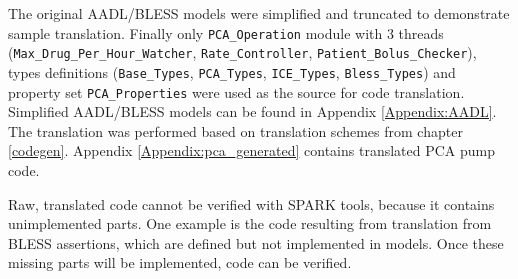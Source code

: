 The original AADL/BLESS models were simplified and truncated to demonstrate sample translation. Finally only \lstinline{PCA_Operation} module with 3 threads (\lstinline{Max_Drug_Per_Hour_Watcher}, \lstinline{Rate_Controller}, \lstinline{Patient_Bolus_Checker}), types definitions (\lstinline{Base_Types}, \lstinline{PCA_Types}, \lstinline{ICE_Types}, \lstinline{Bless_Types}) and property set \lstinline{PCA_Properties} were used as the source for code translation. Simplified AADL/BLESS models can be found in Appendix \ref{Appendix:AADL}. The translation was performed based on translation schemes from chapter \ref{codegen}. Appendix \ref{Appendix:pca_generated} contains translated PCA pump code. 

Raw, translated code cannot be verified with SPARK tools, because it contains unimplemented parts. One example is the code resulting from translation from BLESS assertions, which are defined but not implemented in models. Once these missing parts will be implemented, code can be verified.

